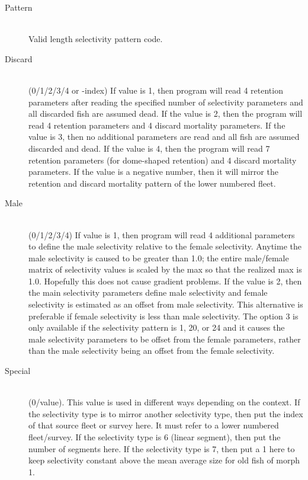 \begin{description}
	\item[Pattern]\hfill\\
	Valid length selectivity pattern code.

	\hypertarget{DomeRetention}{}
	\item[Discard]\hfill\\
	(0/1/2/3/4 or -index)  If value is 1, then program will read 4 retention parameters after reading the specified number of selectivity parameters and all discarded fish are assumed dead.  If the value is 2, then the program will read 4 retention parameters and 4 discard mortality parameters.  If the value is 3, then no additional parameters are read and all fish are assumed discarded and dead. If the value is 4, then the program will read 7 retention parameters (for dome-shaped retention) and 4 discard mortality parameters.  If the value is a negative number, then it will mirror the retention and discard mortality pattern of the lower numbered fleet.

	\item[Male]\hfill\\
	(0/1/2/3/4)  If value is 1, then program will read 4 additional parameters to define the male selectivity relative to the female selectivity.  Anytime the male selectivity is caused to be greater than 1.0; the entire male/female matrix of selectivity values is scaled by the max so that the realized max is 1.0.  Hopefully this does not cause gradient problems.  If the value is 2, then the main selectivity parameters define male selectivity and female selectivity is estimated as an offset from male selectivity.  This alternative is preferable if female selectivity is less than male selectivity.  The option 3 is only available if the selectivity pattern is 1, 20, or 24 and it causes the male selectivity parameters to be offset from the female parameters, rather than the male selectivity being an offset from the female selectivity.

	\item[Special]\hfill\\
	(0/value).  This value is used in different ways depending on the context.  If the selectivity type is to mirror another selectivity type, then put the index of that source fleet or survey here.  It must refer to a lower numbered fleet/survey.  If the selectivity type is 6 (linear segment), then put the number of segments here.  If the selectivity type is 7, then put a 1 here to keep selectivity constant above the mean average size for old fish of morph 1.
\end{description}

